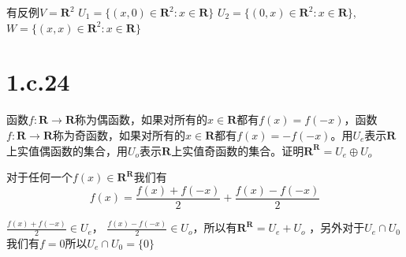 \documentclass[10pt,a4paper,UTF8]{article}
\begin{document}
\begin{answer}
有反例\(V = \mathbf{R}^{2}\) \(U_{1} = \{(x,0)\in \mathbf{R}^{2}:x\in \mathbf{R}\}\) \(U_{2} = \{(0,x)\in \mathbf{R}^{2}:x\in \mathbf{R}\}\), \(W = \{(x,x)\in \mathbf{R}^{2}:x\in \mathbf{R}\}\)
\end{answer}
\section*{1.c.24}
\label{sec:orgf3e0a8a}


\begin{problem}
函数\(f: \mathbf{R}\rightarrow \mathbf{R}\)称为偶函数，如果对所有的\(x\in \mathbf{R}\)都有\(f(x) = f(-x)\)，函数\(f: \mathbf{R}\rightarrow \mathbf{R}\)称为奇函数，如果对所有的\(x\in \mathbf{R}\)都有\(f(x) = -f(-x)\)。用\(U_{e}\)表示\(\mathbf{R}\)上实值偶函数的集合，用\(U_{o}\)表示\(\mathbf{R}\)上实值奇函数的集合。证明\(\mathbf{R}^{ \mathbf{R}} = U_{e} \oplus U_{o}\)
\end{problem}

\begin{answer}
对于任何一个\(f(x)\in \mathbf{R}^{ \mathbf{R}}\)我们有
\begin{equation}
\label{eq:1}
f(x) = \frac{f(x) + f(-x)}{2} + \frac{f(x) - f(-x)}{2}
\end{equation}

\(\frac{f(x)+f(-x)}{2}\in U_{e}\)， \(\frac{f(x)-f(-x)}{2}\in U_{o}\)，所以有\(\mathbf{R}^{\mathbf{R}} = U_{e} + U_{o}\) ，另外对于\(U_{e}\cap U_{0}\)我们有\(f =0\)所以\(U_{e}\cap U_{0} = \{0\}\)
\end{answer}
\end{document}
